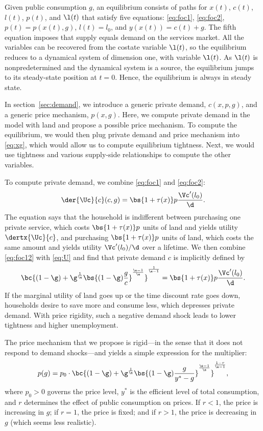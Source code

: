\documentclass[letterpaper,12pt,leqno]{article}
\begin{document}
\begin{bibunit}
Given public consumption $g$, an equilibrium consists of paths for $x(t)$, $c(t)$, $l(t)$, $p(t)$, and $\l(t)$ that satisfy five equations: \eqref{eq:foc1}, \eqref{eq:foc2}, $p(t)=p(x(t),g)$, $l(t)=l_{0}$, and $y(x(t)) = c(t)+g$. The fifth equation imposes that supply equals demand on the services market. All the variables can be recovered from the costate variable $\l(t)$, so the equilibrium reduces to a dynamical system of dimension one, with variable $\l(t)$. As $\l(t)$ is nonpredetermined and the dynamical system is a source, the equilibrium jumps to its steady-state position at $t=0$. Hence, the equilibrium is always in steady state.

In section~\ref{sec:demand}, we introduce a generic private demand, $c(x,p,g)$, and a generic price mechanism, $p(x,g)$. Here, we compute private demand in the model with land and propose a possible price mechanism. To compute the equilibrium, we would then plug private demand and price mechanism into \eqref{eq:xg}, which would allow us to compute equilibrium tightness. Next, we would use tightness and various supply-side relationships to compute the other variables.

To compute private demand, we combine \eqref{eq:foc1} and \eqref{eq:foc2}:
\begin{equation}
\der{\Uc}{c}(c,g)=\bs{1+\tau(x)} p \frac{\Vc'(l_{0})}{\d}.
\label{eq:foc12}\end{equation}
The equation says that the household is indifferent between purchasing one private service, which costs $\bs{1+\tau(x)} p$ units of land and yields utility $\dertx{\Uc}{c}$, and purchasing $\bs{1+\tau(x)} p$ units of land, which costs the same amount and yields utility $\Vc'(l_{0})/\d$ over a lifetime. We then combine \eqref{eq:foc12} with \eqref{eq:U} and find that private demand $c$ is implicitly defined by​
\begin{equation}
\bc{(1-\g)+\g^{\frac{1}{\e}} \bs{(1-\g) \frac{g}{c}}^{\frac{\e-1}{\e}}}^{\frac{1}{\e-1}}=\bs{1+\tau(x)}  p   \frac{\Vc'(l_{0})}{\d}.
\label{eq:ad}\end{equation}
If the marginal utility of land goes up or the time discount rate goes down, households desire to save more and consume less, which depresses private demand. With price rigidity, such a negative demand shock leads to lower tightness and higher unemployment.

The price mechanism that we propose is rigid---in the sense that it does not respond to demand shocks---and yields a simple expression for the multiplier:
\begin{equation}
p(g)= p_{0} \cdot \bc{(1-\g)+\g^{\frac{1}{\e}} \bs{(1-\g)\frac{g}{y^*-g}}^{\frac{\e-1}{\e}}}^{\frac{1-r}{\e-1}},
\label{eq:p}\end{equation}
where $p_{0}>0$ governs the price level, $y^*$ is the efficient level of total consumption, and $r$ determines the effect of public consumption on prices. If $r<1$, the price is increasing in $g$; if $r=1$, the price is fixed; and if $r>1$, the price is decreasing in $g$ (which seems less realistic). 


\end{bibunit}
\end{document}
